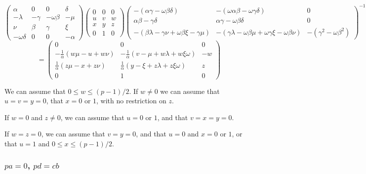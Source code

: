 \documentclass[10pt]{article}
\begin{document}
\[
\left( 
\begin{array}{cccc}
\alpha & 0 & 0 & \delta \\ 
-\lambda & -\gamma & -\omega \beta & -\mu \\ 
\nu & \beta & \gamma & \xi \\ 
-\omega \delta & 0 & 0 & -\alpha%
\end{array}%
\right) \left( 
\begin{array}{ccc}
0 & 0 & 0 \\ 
u & v & w \\ 
x & y & z \\ 
0 & 1 & 0%
\end{array}%
\right) \left( 
\begin{array}{ccc}
-(\alpha \gamma -\omega \beta \delta ) & -(\omega \alpha \beta -\omega
\gamma \delta ) & 0 \\ 
\alpha \beta -\gamma \delta & \alpha \gamma -\omega \beta \delta & 0 \\ 
-(\beta \lambda -\gamma \nu +\omega \beta \xi -\gamma \mu ) & -(\gamma
\lambda -\omega \beta \mu +\omega \gamma \xi -\omega \beta \nu ) & -(\gamma
^{2}-\omega \beta ^{2})%
\end{array}%
\right) ^{-1} 
\]
\[
=\left( 
\begin{array}{ccc}
0 & 0 & 0 \\ 
-\frac{1}{\alpha }\left( w\mu -u+w\nu \right) & -\frac{1}{\alpha }\left(
v-\mu +w\lambda +w\xi \omega \right) & -w \\ 
\frac{1}{\alpha }\left( z\mu -x+z\nu \right) & \frac{1}{\alpha }\left( y-\xi
+z\lambda +z\xi \omega \right) & z \\ 
0 & 1 & 0%
\end{array}%
\right) \allowbreak 
\]

We can assume that $0\leq w\leq (p-1)/2$. If $w\neq 0$ we can assume that $%
u=v=y=0$, that $x=0$ or $1$, with no restriction on $z$.

If $w=0$ and $z\neq 0$, we can assume that $u=0$ or $1$, and that $v=x=y=0$.

If $w=z=0$, we can assume that $v=y=0$, and that $u=0$ and $x=0$ or $1$, or
that $u=1$ and $0\leq x\leq (p-1)/2$.

\subsubsection{ $pa=0$, $pd=cb$}
\end{document}
